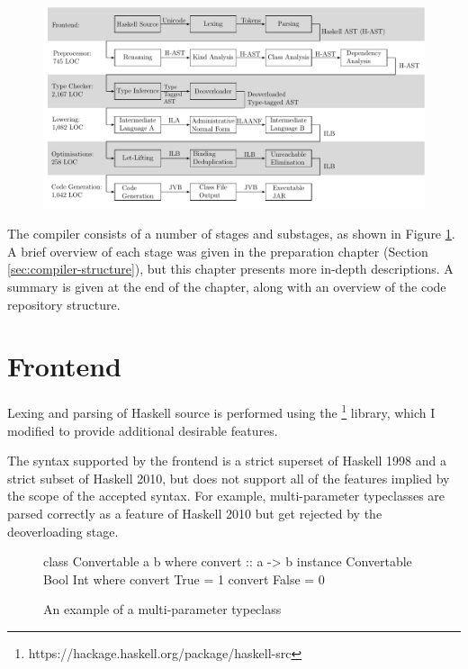 \documentclass[dissertation.tex]{subfiles}
\begin{document}
\begin{figure}[h]
    \includegraphics[width=\textwidth]{figures/compiler_layout.pdf}
    \caption{}
    \label{fig:compiler-layout}
\end{figure}

The compiler consists of a number of stages and substages, as shown in Figure \ref{fig:compiler-layout}. A brief overview of each stage was given in the preparation chapter (Section \ref{sec:compiler-structure}), but this chapter presents more in-depth descriptions. A summary is given at the end of the chapter, along with an overview of the code repository structure.

\section{Frontend}
{
    Lexing and parsing of Haskell source is performed using the \footnote{https://hackage.haskell.org/package/haskell-src} library, which I modified to provide additional desirable features.

    The syntax supported by the frontend is a strict superset of Haskell 1998 and a strict subset of Haskell 2010, but \compilername does not support all of the features implied by the scope of the accepted syntax. For example, multi-parameter typeclasses are parsed correctly as a feature of Haskell 2010 but get rejected by the deoverloading stage.

    \begin{figure}[h]
        \begin{haskellfigure}
        class Convertable a b where
            convert :: a -> b
        instance Convertable Bool Int where
            convert True = 1
            convert False = 0
        \end{haskellfigure}
        \caption{An example of a multi-parameter typeclass}
    \end{figure}
}
\end{document}
